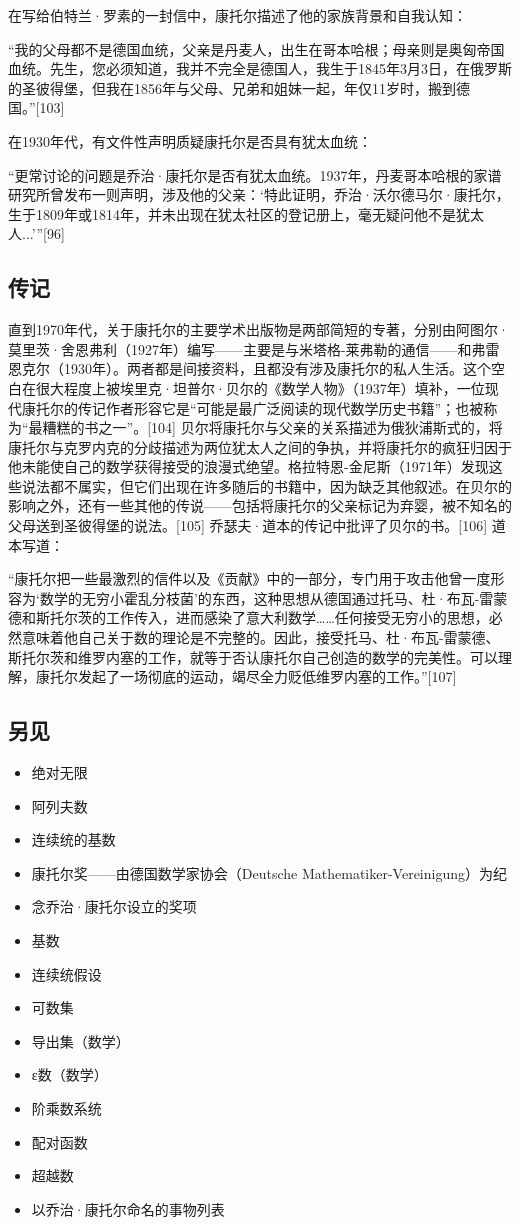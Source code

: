 在写给伯特兰·罗素的一封信中，康托尔描述了他的家族背景和自我认知：

“我的父母都不是德国血统，父亲是丹麦人，出生在哥本哈根；母亲则是奥匈帝国血统。先生，您必须知道，我并不完全是德国人，我生于1845年3月3日，在俄罗斯的圣彼得堡，但我在1856年与父母、兄弟和姐妹一起，年仅11岁时，搬到德国。”[103]

在1930年代，有文件性声明质疑康托尔是否具有犹太血统：

“更常讨论的问题是乔治·康托尔是否有犹太血统。1937年，丹麦哥本哈根的家谱研究所曾发布一则声明，涉及他的父亲：‘特此证明，乔治·沃尔德马尔·康托尔，生于1809年或1814年，并未出现在犹太社区的登记册上，毫无疑问他不是犹太人...’”[96]
\subsection{传记}  
直到1970年代，关于康托尔的主要学术出版物是两部简短的专著，分别由阿图尔·莫里茨·舍恩弗利（1927年）编写——主要是与米塔格-莱弗勒的通信——和弗雷恩克尔（1930年）。两者都是间接资料，且都没有涉及康托尔的私人生活。这个空白在很大程度上被埃里克·坦普尔·贝尔的《数学人物》（1937年）填补，一位现代康托尔的传记作者形容它是“可能是最广泛阅读的现代数学历史书籍”；也被称为“最糟糕的书之一”。[104] 贝尔将康托尔与父亲的关系描述为俄狄浦斯式的，将康托尔与克罗内克的分歧描述为两位犹太人之间的争执，并将康托尔的疯狂归因于他未能使自己的数学获得接受的浪漫式绝望。格拉特恩-金尼斯（1971年）发现这些说法都不属实，但它们出现在许多随后的书籍中，因为缺乏其他叙述。在贝尔的影响之外，还有一些其他的传说——包括将康托尔的父亲标记为弃婴，被不知名的父母送到圣彼得堡的说法。[105] 乔瑟夫·道本的传记中批评了贝尔的书。[106] 道本写道：

“康托尔把一些最激烈的信件以及《贡献》中的一部分，专门用于攻击他曾一度形容为‘数学的无穷小霍乱分枝菌’的东西，这种思想从德国通过托马、杜·布瓦-雷蒙德和斯托尔茨的工作传入，进而感染了意大利数学……任何接受无穷小的思想，必然意味着他自己关于数的理论是不完整的。因此，接受托马、杜·布瓦-雷蒙德、斯托尔茨和维罗内塞的工作，就等于否认康托尔自己创造的数学的完美性。可以理解，康托尔发起了一场彻底的运动，竭尽全力贬低维罗内塞的工作。”[107]
\subsection{另见}
\begin{itemize}
\item 绝对无限  
\item 阿列夫数  
\item 连续统的基数  
\item 康托尔奖——由德国数学家协会（Deutsche Mathematiker-Vereinigung）为纪\item 念乔治·康托尔设立的奖项  
\item 基数  
\item 连续统假设  
\item 可数集  
\item 导出集（数学）  
\item ε数（数学）  
\item 阶乘数系统  
\item 配对函数  
\item 超越数  
\item 以乔治·康托尔命名的事物列表
\end{itemize}
